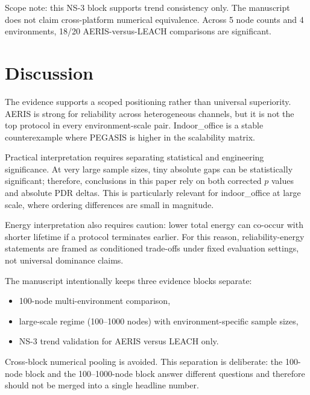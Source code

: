 \documentclass[sensors,article,submit,moreauthors,pdftex]{Definitions/mdpi}
\begin{document}
Scope note: this NS-3 block supports trend consistency only. The manuscript does not claim cross-platform numerical equivalence. Across 5 node counts and 4 environments, 18/20 AERIS-versus-LEACH comparisons are significant.

\section{Discussion}
The evidence supports a scoped positioning rather than universal superiority. AERIS is strong for reliability across heterogeneous channels, but it is not the top protocol in every environment-scale pair. Indoor\_office is a stable counterexample where PEGASIS is higher in the scalability matrix.

Practical interpretation requires separating statistical and engineering significance. At very large sample sizes, tiny absolute gaps can be statistically significant; therefore, conclusions in this paper rely on both corrected $p$ values and absolute PDR deltas. This is particularly relevant for indoor\_office at large scale, where ordering differences are small in magnitude.

Energy interpretation also requires caution: lower total energy can co-occur with shorter lifetime if a protocol terminates earlier. For this reason, reliability-energy statements are framed as conditioned trade-offs under fixed evaluation settings, not universal dominance claims.

The manuscript intentionally keeps three evidence blocks separate:
\begin{itemize}
\item 100-node multi-environment comparison,
\item large-scale regime (100--1000 nodes) with environment-specific sample sizes,
\item NS-3 trend validation for AERIS versus LEACH only.
\end{itemize}
Cross-block numerical pooling is avoided. This separation is deliberate: the 100-node block and the 100--1000-node block answer different questions and therefore should not be merged into a single headline number.
\end{document}
